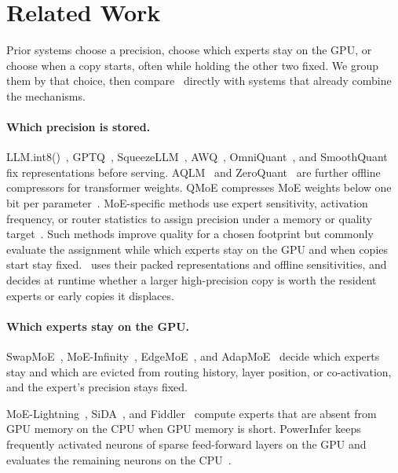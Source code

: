 \section{Related Work}
\label{sec:related}

Prior systems choose a precision, choose which experts stay on the GPU, or choose when a copy starts, often while holding the other two fixed.
We group them by that choice, then compare \systemname\ directly with systems that already combine the mechanisms.

\paragraph{Which precision is stored.}
LLM.int8()~\cite{dettmers2022gptint8}, GPTQ~\cite{frantar2022gptq}, SqueezeLLM~\cite{kim2024squeezellm}, AWQ~\cite{lin2024awq}, OmniQuant~\cite{shao2024omniquant}, and SmoothQuant~\cite{xiao2023smoothquant} fix representations before serving.
AQLM~\cite{egiazarian2024aqlm} and ZeroQuant~\cite{yao2022zeroquant} are further offline compressors for transformer weights.
QMoE compresses MoE weights below one bit per parameter~\cite{frantar2023qmoepracticalsub1bitcompression}.
MoE-specific methods use expert sensitivity, activation frequency, or router statistics to assign precision under a memory or quality target~\cite{kim2023mixturequantizedexpertsmoqe,chitty2025mopeq,chowdhury2026efficient}.
Such methods improve quality for a chosen footprint but commonly evaluate the assignment while which experts stay on the GPU and when copies start stay fixed.
\systemname\ uses their packed representations and offline sensitivities, and decides at runtime whether a larger high-precision copy is worth the resident experts or early copies it displaces.

\paragraph{Which experts stay on the GPU.}
SwapMoE~\cite{kong2024swapmoe}, MoE-Infinity~\cite{xue2024moe}, EdgeMoE~\cite{yi2023edgemoe}, and AdapMoE~\cite{zhong2024adapmoe} decide which experts stay and which are evicted from routing history, layer position, or co-activation, and the expert's precision stays fixed.

MoE-Lightning~\cite{cao2024moe}, SiDA~\cite{du2024sida}, and Fiddler~\cite{kamahori2025fiddler} compute experts that are absent from GPU memory on the CPU when GPU memory is short.
PowerInfer keeps frequently activated neurons of sparse feed-forward layers on the GPU and evaluates the remaining neurons on the CPU~\cite{song2024powerinfer}.

